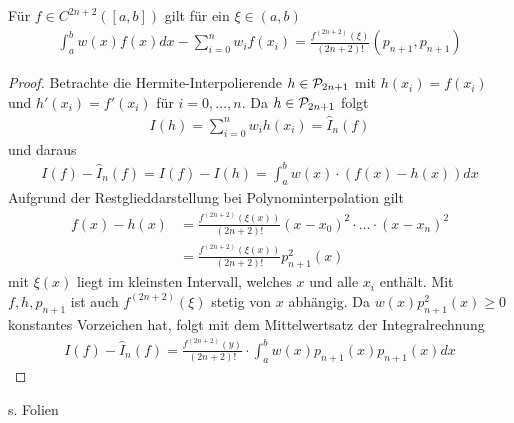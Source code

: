 \begin{Satze}[Approximationsfehler]\label{7.4.9}
  Für $f\in C^{2n+2}([a,b])$ gilt für ein $\xi\in(a,b)$
  \begin{gather}
    \int_a^bw(x)f(x)dx-\sum_{i=0}^nw_if(x_i) =
    \frac{f^{(2n+2)}(\xi)}{(2n+2)!}(p_{n+1},p_{n+1})
    \label{VII.4.8}
  \end{gather}
  
  \begin{proof}
    Betrachte die Hermite-Interpolierende $h\in\mathcal{P}_{2n+1}$
    mit $h(x_i)=f(x_i)$ und $h'(x_i)=f'(x_i)$ für $i=0,\ldots,n$.
    Da $h\in\mathcal{P}_{2n+1}$ folgt
    \begin{gather*}
      I(h) = \sum_{i=0}^nw_ih(x_i)=\hat{I}_n(f)
    \end{gather*}
    und daraus 
    \begin{gather*}
      I(f)-\hat{I}_n(f) = I(f)-I(h) 
      =\int_a^bw(x)\cdot\left( f(x)-h(x)\right) dx
    \end{gather*}
    Aufgrund der Restglieddarstellung bei Polynominterpolation gilt
    \begin{align*}
      f(x)-h(x) &= \frac{f^{(2n+2)}\left(\xi(x)\right)}{(2n+2)!}(x-x_0)^2
                  \cdot \ldots\cdot (x-x_n)^2 \\
                &=\frac{f^{(2n+2)}\left(\xi(x)\right)}{(2n+2)!}p_{n+1}^2(x)
    \end{align*}
    mit $\xi(x)$ liegt im kleinsten Intervall, welches $x$ und alle $x_i$
    enthält.
    Mit $f,h,p_{n+1}$ ist auch $f^{(2n+2)}(\xi)$ stetig von $x$ abhängig.
    Da $w(x)p_{n+1}^2(x)\geq 0$ konstantes Vorzeichen hat,
    folgt mit dem Mittelwertsatz der Integralrechnung
    \begin{gather*}
      I(f) -\hat{I}_n(f) = \frac{f^{(2n+2)}(y)}{(2n+2)!}
      \cdot \int_a^bw(x)p_{n+1}(x)p_{n+1}(x)dx
    \end{gather*}
  \end{proof}
\end{Satze}

\label{7.4.10} %
s. Folien






